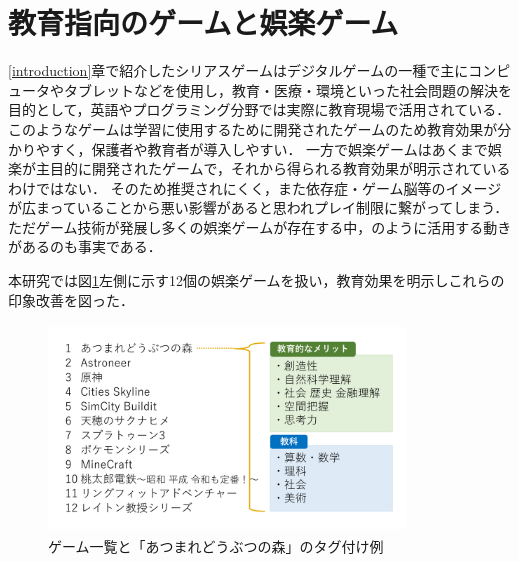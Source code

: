 \documentclass[twocolumn,10pt,a4j]{ltjsarticle}
\begin{document}
\section{教育指向のゲームと娯楽ゲーム}

\ref{introduction}章で紹介したシリアスゲームはデジタルゲームの一種で主にコンピュータやタブレットなどを使用し，教育・医療・環境といった社会問題の解決を目的として，英語やプログラミング分野では実際に教育現場で活用されている．
このようなゲームは学習に使用するために開発されたゲームのため教育効果が分かりやすく，保護者や教育者が導入しやすい．
一方で娯楽ゲームはあくまで娯楽が主目的に開発されたゲームで，それから得られる教育効果が明示されているわけではない．
そのため推奨されにくく，また依存症・ゲーム脳等のイメージが広まっていることから悪い影響があると思われプレイ制限に繋がってしまう．
ただゲーム技術が発展し多くの娯楽ゲームが存在する中，\cite{tvgame}のように活用する動きがあるのも事実である．

本研究では図\ref{fig:ゲーム一覧}左側に示す12個の娯楽ゲームを扱い，教育効果を明示しこれらの印象改善を図った．


\vspace{1zh}
\begin{figure}[h]
 \begin{center}
  \includegraphics[clip,width=95mm,height=55mm]{games.pdf}
 \end{center}
 \caption{ゲーム一覧と「あつまれどうぶつの森」のタグ付け例}
 \label{fig:ゲーム一覧}
\end{figure}
\end{document}
